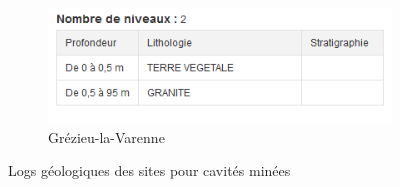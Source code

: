 \documentclass[11pt,french,a4paper]{article}
\begin{document}
\begin{figure}
\begin{subfigure}[b]{0.48\textwidth}
     \end{subfigure}
     \begin{subfigure}[b]{0.48\textwidth}
         \centering
         \includegraphics[width=\textwidth]{image/annexe/chap4/minees/grezieu.png}
         \caption{Grézieu-la-Varenne}
     \end{subfigure}
        \caption{Logs géologiques des sites pour cavités minées}
\end{figure}
\end{document}
